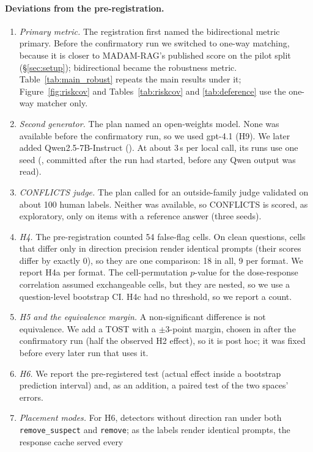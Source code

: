 \paragraph{Deviations from the pre-registration.}
\begin{enumerate}[leftmargin=*,itemsep=1pt,topsep=2pt]
\item \emph{Primary metric.} The registration first named the bidirectional metric primary. Before
the confirmatory run we switched to one-way matching, because it is closer to MADAM-RAG's published score on the pilot
split (\S\ref{sec:setup}); bidirectional became the robustness metric. Table~\ref{tab:main_robust} repeats the main
results under it; Figure~\ref{fig:riskcov} and Tables~\ref{tab:riskcov} and \ref{tab:deference} use the one-way
matcher only.
\item \emph{Second generator.} The plan named an open-weights model. None was available before the confirmatory run, so
we used gpt-4.1 (H9). We later added Qwen2.5-7B-Instruct (). At about 3\,s per local call, its runs use one seed
(, committed after the run had started, before any Qwen output was read).
\item \emph{CONFLICTS judge.} The plan called for an outside-family judge validated on about 100 human
labels. Neither was available, so CONFLICTS is scored, as exploratory, only on items with a reference answer
(three seeds).
\item \emph{H4.} The pre-registration counted 54 false-flag cells. On clean questions, cells that differ only in
direction precision render identical prompts (their scores differ by exactly 0), so they are one comparison: 18 in
all, 9 per format. We report H4a per format. The cell-permutation $p$-value for the dose-response correlation assumed
exchangeable cells, but they are nested, so we use a question-level bootstrap CI. H4c had no threshold,
so we report a count.
\item \emph{H5 and the equivalence margin.} A non-significant difference is not equivalence. We add a TOST with a
$\pm$3-point margin, chosen in  after the confirmatory run (half the observed H2 effect), so it is post hoc; it
was fixed before every later run that uses it.
\item \emph{H6.} We report the pre-registered test (actual effect inside a bootstrap prediction interval) and, as an
addition, a paired test of the two spaces' errors.
\item \emph{Placement modes.} For H6, detectors without direction ran under both
\texttt{remove\_suspect} and \texttt{remove}; as the labels render identical prompts, the response cache served every

\end{enumerate}
